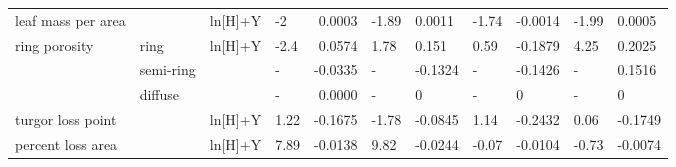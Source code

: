 \documentclass[]{article}
\begin{document}
\begin{table}[!h]
{\begin{tabular}{llllrllllll}
leaf mass per area &  & ln[H]+Y & -2 & 0.0003 & -1.89 & 0.0011 & -1.74 & -0.0014 & -1.99 & 0.0005\\
ring porosity & ring & ln[H]+Y & -2.4 & 0.0574 & 1.78 & 0.151 & 0.59 & -0.1879 & 4.25 & 0.2025\\
 & semi-ring &  & - & -0.0335 & - & -0.1324 & - & -0.1426 & - & 0.1516\\
 & diffuse &  & - & 0.0000 & - & 0 & - & 0 & - & 0\\
\addlinespace
turgor loss point &  & ln[H]+Y & 1.22 & -0.1675 & -1.78 & -0.0845 & 1.14 & -0.2432 & 0.06 & -0.1749\\
percent loss area &  & ln[H]+Y & 7.89 & -0.0138 & 9.82 & -0.0244 & -0.07 & -0.0104 & -0.73 & -0.0074\\
\bottomrule
\end{tabular}}
\end{table}
\end{document}

